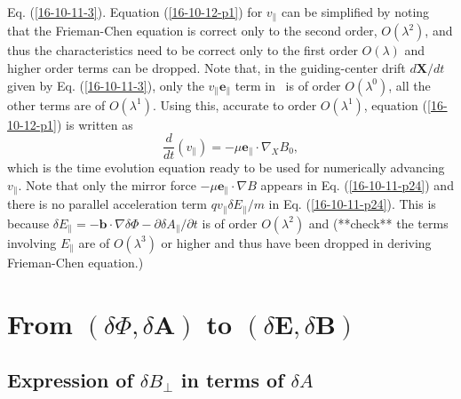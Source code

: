 \documentclass{article}
\begin{document}
Eq. (\ref{16-10-11-3}). Equation (\ref{16-10-12-p1}) for $v_{\parallel}$ can
be simplified by noting that the Frieman-Chen equation is correct only to the
second order, $O (\lambda^2)$, and thus the characteristics need to be correct
only to the first order $O (\lambda)$ and higher order terms can be dropped.
Note that, in the guiding-center drift $d\mathbf{X}/ d t$ given by Eq.
(\ref{16-10-11-3}), only the $v_{\parallel} \mathbf{e}_{\parallel}$ term in \
is of order $O (\lambda^0)$, all the other terms are of $O (\lambda^1)$. Using
this, accurate to order $O (\lambda^1)$, equation (\ref{16-10-12-p1}) is
written as
\begin{equation}
  \label{16-10-11-p24} \frac{d}{d t} (v_{\parallel}) = - \mu
  \mathbf{e}_{\parallel} \cdot \nabla_X B_0,
\end{equation}
which is the time evolution equation ready to be used for numerically
advancing $v_{\parallel}$. Note that only the mirror force $- \mu
\mathbf{e}_{\parallel} \cdot \nabla B$ appears in Eq. (\ref{16-10-11-p24}) and
there is no parallel acceleration term $q v_{\parallel} \delta E_{\parallel} /
m$ in Eq. (\ref{16-10-11-p24}). This is because $\delta E_{\parallel} =
-\mathbf{b} \cdot \nabla \delta \Phi - \partial \delta A_{\parallel} /
\partial t$ is of order $O (\lambda^2)$ and (**check** the terms involving
$E_{\parallel}$ are of $O (\lambda^3)$ or higher and thus have been dropped in
deriving Frieman-Chen equation.)

\section{From $(\delta \Phi, \delta \mathbf{A})$ to $(\delta \mathbf{E},
\delta \mathbf{B})$}

\subsection{Expression of $\delta B_{\perp}$ in terms of $\delta A$}
\end{document}
